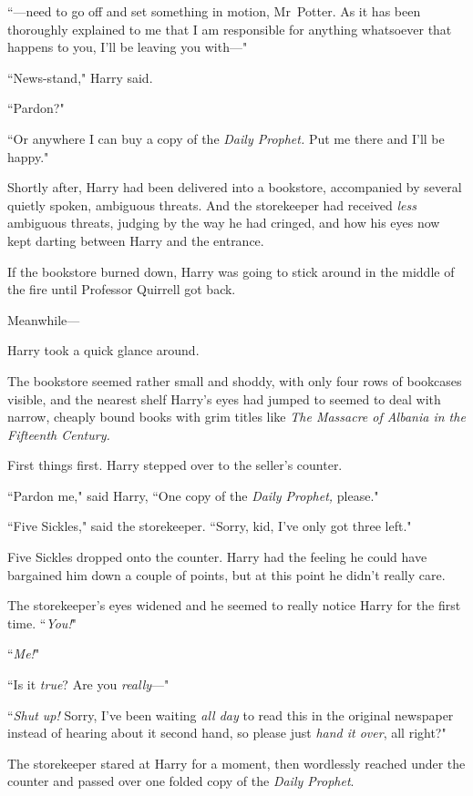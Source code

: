 ``—need to go off and set something in motion, Mr~Potter. As it has been thoroughly explained to me that I am responsible for anything whatsoever that happens to you, I'll be leaving you with—"

``News-stand," Harry said.

``Pardon?"

``Or anywhere I can buy a copy of the \emph{Daily Prophet.} Put me there and I'll be happy."

Shortly after, Harry had been delivered into a bookstore, accompanied by several quietly spoken, ambiguous threats. And the storekeeper had received \emph{less} ambiguous threats, judging by the way he had cringed, and how his eyes now kept darting between Harry and the entrance.

If the bookstore burned down, Harry was going to stick around in the middle of the fire until Professor Quirrell got back.

Meanwhile—

Harry took a quick glance around.

The bookstore seemed rather small and shoddy, with only four rows of bookcases visible, and the nearest shelf Harry's eyes had jumped to seemed to deal with narrow, cheaply bound books with grim titles like \emph{The Massacre of Albania in the Fifteenth Century.}

First things first. Harry stepped over to the seller's counter.

``Pardon me," said Harry, ``One copy of the \emph{Daily Prophet,} please."

``Five Sickles," said the storekeeper. ``Sorry, kid, I've only got three left."

Five Sickles dropped onto the counter. Harry had the feeling he could have bargained him down a couple of points, but at this point he didn't really care.

The storekeeper's eyes widened and he seemed to really notice Harry for the first time. ``\emph{You!}"

``\emph{Me!}"

``Is it \emph{true}? Are you \emph{really}—"

``\emph{Shut up!} Sorry, I've been waiting \emph{all day} to read this in the original newspaper instead of hearing about it second hand, so please just \emph{hand it over}, all right?"

The storekeeper stared at Harry for a moment, then wordlessly reached under the counter and passed over one folded copy of the \emph{Daily Prophet}.

